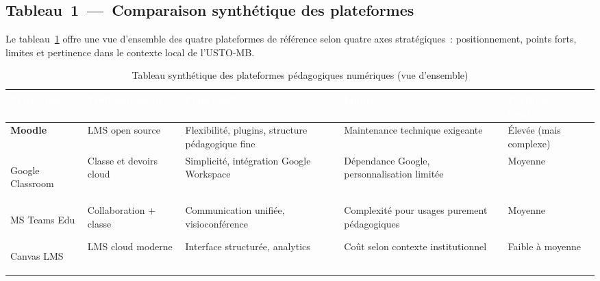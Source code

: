 \subsection{Tableau~1~---~Comparaison synth\'etique des plateformes}

Le tableau~\ref{tab:compar_synth} offre une vue d'ensemble des quatre plateformes de r\'ef\'erence selon quatre axes strat\'egiques~: positionnement, points forts, limites et pertinence dans le contexte local de l'USTO-MB.

\renewcommand{\arraystretch}{1.8}
{\setlength{\tabcolsep}{7pt}
\begin{table}[H]
\centering
\caption{Tableau synth\'etique des plateformes p\'edagogiques num\'eriques (vue d'ensemble)}
\label{tab:compar_synth}
\begin{tabular}{|>{\bfseries}p{2.3cm}|p{2.5cm}|p{3.2cm}|p{3.0cm}|p{2.2cm}|}

\hline
\rowcolor{ustoblue}
\textcolor{white}{\textbf{Plateforme}} &
\textcolor{white}{\textbf{Positionnement}} &
\textcolor{white}{\textbf{Points forts}} &
\textcolor{white}{\textbf{Limites}} &
\textcolor{white}{\textbf{Pertinence locale}} \\
\hline

\rowcolor{ustolightblue!40}
Moodle &
LMS open source &
Flexibilit\'e, plugins, structure p\'edagogique fine &
Maintenance technique exigeante &
\'Elev\'ee (mais complexe) \\
\hline

\rowcolor{rowgray}
Google Classroom &
Classe et devoirs cloud &
Simplicit\'e, int\'egration Google Workspace &
D\'ependance Google, personnalisation limit\'ee &
Moyenne \\
\hline

\rowcolor{ustolightblue!40}
MS Teams Edu &
Collaboration + classe &
Communication unifi\'ee, visioconf\'erence &
Complexit\'e pour usages purement p\'edagogiques &
Moyenne \\
\hline

\rowcolor{rowgray}
Canvas LMS &
LMS cloud moderne &
Interface structur\'ee, analytics &
Co\^ut selon contexte institutionnel &
Faible \`a moyenne \\
\hline

\end{tabular}
\end{table}}

